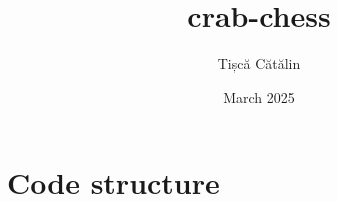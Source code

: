 \documentclass{article}
\title{crab-chess}
\author{Tișcă Cătălin}
\date{March 2025}
\begin{document}
\maketitle


\section{Code structure}
\end{document}
